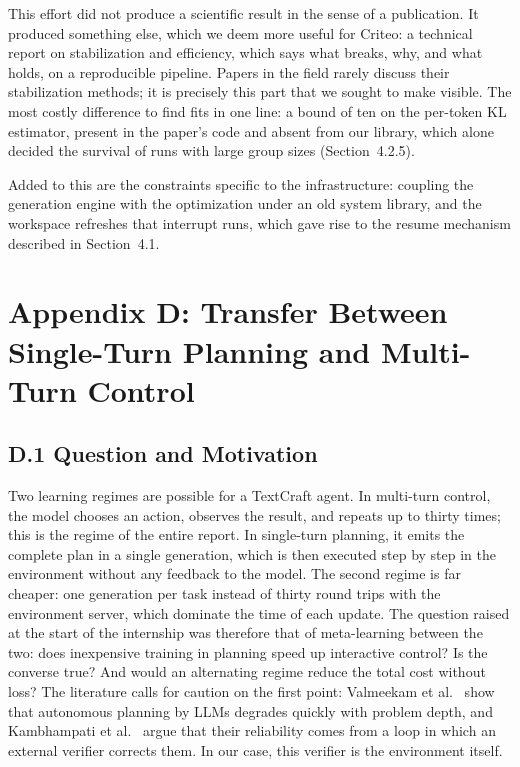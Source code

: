 \documentclass[11pt,a4paper]{article}
\begin{document}
This effort did not produce a scientific result in the sense of a publication. It produced something else, which we deem more useful for Criteo: a technical report on stabilization and efficiency, which says what breaks, why, and what holds, on a reproducible pipeline. Papers in the field rarely discuss their stabilization methods; it is precisely this part that we sought to make visible. The most costly difference to find fits in one line: a bound of ten on the per-token KL estimator, present in the paper's code and absent from our library, which alone decided the survival of runs with large group sizes (Section~4.2.5).


Added to this are the constraints specific to the infrastructure: coupling the generation engine with the optimization under an old system library, and the workspace refreshes that interrupt runs, which gave rise to the resume mechanism described in Section~4.1.





\section{Appendix D: Transfer Between Single-Turn Planning and Multi-Turn Control}
\label{annexe:transfert}

\subsection*{D.1 Question and Motivation}
Two learning regimes are possible for a TextCraft agent. In multi-turn control, the model chooses an action, observes the result, and repeats up to thirty times; this is the regime of the entire report. In single-turn planning, it emits the complete plan in a single generation, which is then executed step by step in the environment without any feedback to the model. The second regime is far cheaper: one generation per task instead of thirty round trips with the environment server, which dominate the time of each update. The question raised at the start of the internship was therefore that of meta-learning between the two: does inexpensive training in planning speed up interactive control? Is the converse true? And would an alternating regime reduce the total cost without loss? The literature calls for caution on the first point: Valmeekam et al.~\cite{valmeekam2023planning} show that autonomous planning by LLMs degrades quickly with problem depth, and Kambhampati et al.~\cite{kambhampati2024llmmodulo} argue that their reliability comes from a loop in which an external verifier corrects them. In our case, this verifier is the environment itself.
\end{document}
